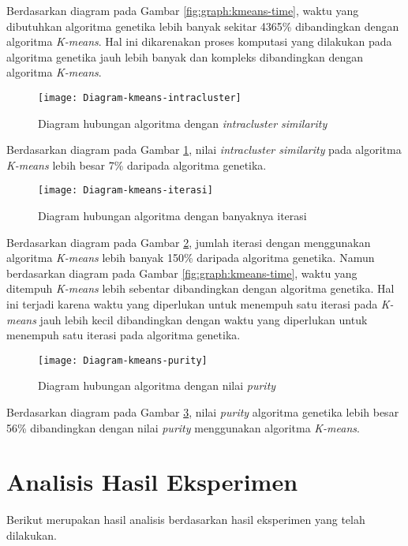 Berdasarkan diagram pada Gambar \ref{fig:graph:kmeans-time}, waktu yang dibutuhkan algoritma genetika lebih banyak sekitar 4365\% dibandingkan dengan algoritma \textit{K-means}. Hal ini dikarenakan proses komputasi yang dilakukan pada algoritma genetika jauh lebih banyak dan kompleks dibandingkan dengan algoritma \textit{K-means}.

\begin{figure}[H]
	\centering
	\texttt{[image: Diagram-kmeans-intracluster]}
	\caption{Diagram hubungan algoritma dengan \textit{intracluster similarity}}
	\label{fig:graph:kmeans-intra}
\end{figure}

Berdasarkan diagram pada Gambar \ref{fig:graph:kmeans-intra}, nilai \textit{intracluster similarity} pada algoritma \textit{K-means} lebih besar 7\% daripada algoritma genetika.

\begin{figure}[H]
	\centering
	\texttt{[image: Diagram-kmeans-iterasi]}
	\caption{Diagram hubungan algoritma dengan banyaknya iterasi}
	\label{fig:graph:kmeans-iteration}
\end{figure}

Berdasarkan diagram pada Gambar \ref{fig:graph:kmeans-iteration}, jumlah iterasi dengan menggunakan algoritma \textit{K-means} lebih banyak 150\% daripada algoritma genetika. Namun berdasarkan diagram pada Gambar \ref{fig:graph:kmeans-time}, waktu yang ditempuh \textit{K-means} lebih sebentar dibandingkan dengan algoritma genetika. Hal ini terjadi karena waktu yang diperlukan untuk menempuh satu iterasi pada \textit{K-means} jauh lebih kecil dibandingkan dengan waktu yang diperlukan untuk menempuh satu iterasi pada algoritma genetika.

\begin{figure}[H]
	\centering
	\texttt{[image: Diagram-kmeans-purity]}
	\caption{Diagram hubungan algoritma dengan nilai \textit{purity}}
	\label{fig:graph:kmeans-purity}
\end{figure}

Berdasarkan diagram pada Gambar \ref{fig:graph:kmeans-purity}, nilai \textit{purity} algoritma genetika lebih besar 56\% dibandingkan dengan nilai \textit{purity} menggunakan algoritma \textit{K-means}.

\section{Analisis Hasil Eksperimen}
Berikut merupakan hasil analisis berdasarkan hasil eksperimen yang telah dilakukan.

